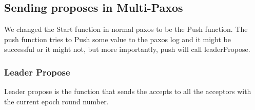 \documentclass[a4paper]{article}
\begin{document}
\subsection{Sending proposes in Multi-Paxos}

We changed the Start function in normal paxos to be the Push function.
The push function tries to Push some value to the paxos log and it might be successful or it might not, but more importantly, push will call leaderPropose.

\subsubsection{Leader Propose}

Leader propose is the function that sends the accepts to all the acceptors with the current epoch round number.
\end{document}
